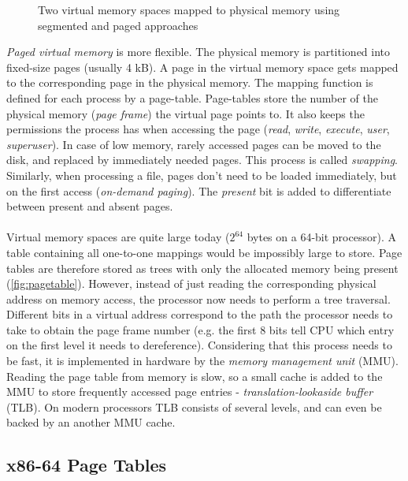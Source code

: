 \begin{figure}
  \caption{Two virtual memory spaces mapped to physical memory using segmented and paged approaches}
\end{figure}

\emph{Paged virtual memory} is more flexible. The physical memory is partitioned into fixed-size pages (usually 4 kB).
A page in the virtual memory space gets mapped to the corresponding page in the physical memory. The mapping
function is defined for each process by a page-table. Page-tables store the number of the physical memory (\emph{page frame})
the virtual page points to. It also keeps the permissions the process has when accessing the page (\emph{read}, \emph{write},
\emph{execute}, \emph{user}, \emph{superuser}). In case of low memory, rarely accessed pages can be moved to the disk, and
replaced by immediately needed pages. This process is called \emph{swapping}. Similarly, when processing a file, pages don't
need to be loaded immediately, but on the first access (\emph{on-demand paging}). The \emph{present} bit is added to differentiate
between present and absent pages.
\\
\\
Virtual memory spaces are quite large today ($2^{64}$ bytes on a 64-bit processor). A table containing all one-to-one mappings would be
impossibly large to store. Page tables are therefore stored as trees with only the allocated memory being present (\autoref{fig:pagetable}).
However, instead of just reading the corresponding physical address on memory access, the processor now needs to perform a tree traversal.
Different bits in a virtual address correspond to the path the processor needs to take to
obtain the page frame number (e.g. the first 8 bits tell CPU which entry on the first level it needs to dereference). Considering that this
process needs to be fast, it is implemented in hardware by the \emph{memory management unit} (MMU). Reading the page table from memory is
slow, so a small cache is added to the MMU to store frequently accessed page entries - \emph{translation-lookaside buffer} (TLB). On modern
processors TLB consists of several levels, and can even be backed by an another MMU cache. 

\subsection{x86-64 Page Tables}

